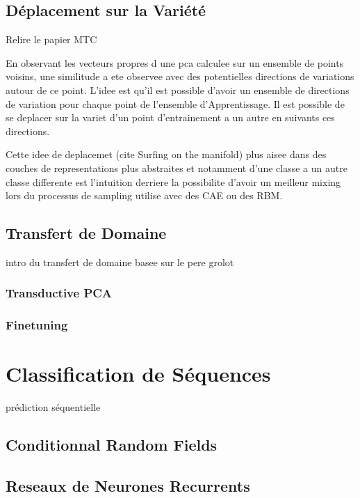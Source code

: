 \subsection{Déplacement sur la Variété}

Relire le papier MTC

En observant les vecteurs propres d une pca calculee sur un ensemble de points
voisins, une similitude a ete observee avec des potentielles directions de
variations autour de ce point. L'idee est qu'il est possible d'avoir un
ensemble de directions de variation pour chaque point de l'ensemble
d'Apprentissage. Il est possible de se deplacer sur la variet d'un point
d'entrainement a un  autre en suivants ces directions.

Cette idee de deplacemet (cite Surfing on the manifold) plus aisee dans des
couches de representations plus abstraites et notamment d'une classe a un autre
classe differente est l'intuition derriere la possibilite d'avoir un meilleur
mixing lors du processus de sampling utilise avec des CAE ou des RBM.

\subsection{Transfert de Domaine}


intro du transfert de domaine basee sur le pere grolot

\subsubsection{Transductive PCA}
\subsubsection{Finetuning}


\section{Classification de Séquences}

prédiction séquentielle

\subsection{Conditionnal Random Fields}


\subsection{Reseaux de Neurones Recurrents}


